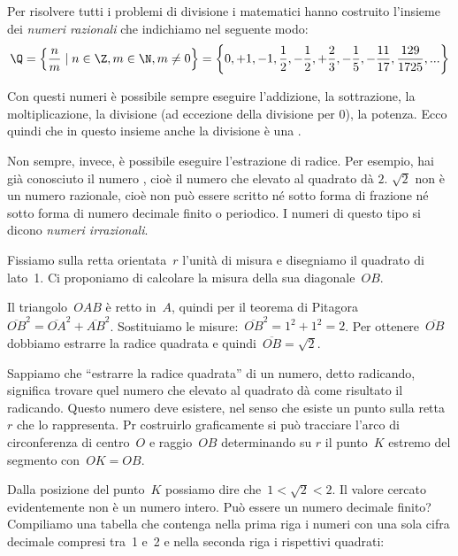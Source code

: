 Per risolvere tutti i problemi di divisione i matematici hanno costruito 
l'insieme dei \emph{numeri razionali} che indichiamo 
nel seguente modo:
\[
\Q=\left\{\frac{n}{m} \mid n\in \Z,m\in \N,m\neq
0\right\}=\left\{0,+1,-1,\frac{1}{2},-\frac{1}{2},+\frac{2}{3},-\frac{1}{5},
-\frac{11}{17},\frac{129}{1725},...\right\}
\]

Con questi numeri è possibile sempre eseguire l'addizione, la sottrazione, 
la moltiplicazione, la divisione (ad eccezione della divisione per 0), la 
potenza. 
Ecco quindi che in questo insieme anche la divisione è una 
. 

Non sempre, invece, è possibile eseguire l'estrazione di radice. 
Per esempio, hai già conosciuto il numero , cioè il 
numero che elevato al quadrato dà \(2\). 
\(\sqrt{2}\) non è un numero razionale, cioè non può essere scritto né sotto 
forma di frazione né sotto forma di numero decimale finito o periodico. 
I numeri di questo tipo si dicono \emph{numeri irrazionali}.

Fissiamo sulla retta orientata~\(r\) l'unità di misura e disegniamo il 
quadrato di lato~1. Ci proponiamo di calcolare la misura della sua 
diagonale~\(OB\).

\begin{center}
 
\end{center}

Il triangolo~\(OAB\) è retto in~\(A\), quindi per il teorema di
Pitagora~\(\overline{OB}^{2}=\overline{OA}^{2}+\overline{AB}^{2}\).
Sostituiamo le misure:~\(\overline{OB}^{2}=1^2+1^2=2\). Per 
ottenere~\(\overline{OB}\)
dobbiamo estrarre la radice quadrata e quindi~\(\overline{OB}=\sqrt{2}\).

Sappiamo che ``estrarre la radice quadrata'' di un numero, detto radicando, 
significa trovare quel numero che elevato al quadrato dà come risultato
il radicando. 
Questo numero deve esistere, nel senso che esiste un punto sulla retta~\(r\) 
che lo rappresenta. Pr costruirlo graficamente si può tracciare l'arco di
circonferenza di centro~\(O\) e raggio~\(OB\) determinando su \(r\) il 
punto~\(K\) estremo del segmento con~\(OK = OB\).

Dalla posizione del punto~\(K\) possiamo dire che~\(1<\sqrt{2}<2\). Il
valore cercato evidentemente non è un numero intero. Può essere un
numero decimale finito? Compiliamo una tabella che contenga nella prima
riga i numeri con una sola cifra decimale compresi tra~1 e~2 e nella
seconda riga i rispettivi quadrati:

